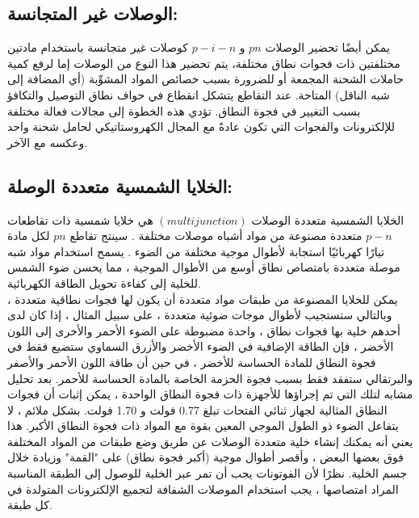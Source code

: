 	\subsection{الوصلات غير المتجانسة: }
	يمكن أيضًا تحضير الوصلات $ p n $ و $ p-i-n $ كوصلات غير متجانسة باستخدام مادتين مختلفتين ذات فجوات نطاق مختلفة، يتم تحضير هذا النوع من الوصلات إما لرفع كمية حاملات الشحنة المجمعة أو للضرورة بسبب خصائص المواد المشوِّبة (أي المضافة إلى شبه الناقل) المتاحة. عند التقاطع يتشكل انقطاع في حواف نطاق التوصيل والتكافؤ بسبب التغيير في فجوة النطاق. تؤدي هذه الخطوة إلى مجالات فعالة مختلفة للإلكترونات والفجوات التي تكون عادةً مع المجال الكهروستاتيكي لحامل شحنة واحد وعكسه مع الآخر.
\subsection{الخلايا الشمسية متعددة الوصلة:}
	الخلايا الشمسية متعددة الوصلات $ (multi junction ) $ هي خلايا شمسية ذات تقاطعات $ p-n $ متعددة مصنوعة من مواد أشباه موصلات مختلفة . سينتج تقاطع $ pn $ لكل مادة تيارًا كهربائيًا استجابة لأطوال موجية مختلفة من الضوء . يسمح استخدام مواد شبه موصلة متعددة بامتصاص نطاق أوسع من الأطوال الموجية ، مما يحسن ضوء الشمس للخلية إلى كفاءة تحويل الطاقة الكهربائية.
	\\يمكن للخلايا المصنوعة من طبقات مواد متعددة أن يكون لها فجوات نطاقية متعددة ، وبالتالي ستستجيب لأطوال موجات ضوئية متعددة ،
	على سبيل المثال ، إذا كان لدى أحدهم خلية بها فجوات نطاق ، واحدة مضبوطة على الضوء الأحمر والأخرى إلى اللون الأخضر ، فإن الطاقة الإضافية في الضوء الأخضر والأزرق السماوي ستضيع فقط في فجوة النطاق للمادة الحساسة للأخضر ، في حين أن طاقة اللون الأحمر والأصفر والبرتقالي ستفقد فقط بسبب فجوة الحزمة الخاصة بالمادة الحساسة للأحمر. بعد تحليل مشابه لتلك التي تم إجراؤها للأجهزة ذات فجوة النطاق الواحدة ، يمكن إثبات أن فجوات النطاق المثالية لجهاز ثنائي الفتحات تبلغ 0.77  فولت و 1.70  فولت. بشكل ملائم ، لا يتفاعل الضوء ذو الطول الموجي المعين بقوة مع المواد ذات فجوة النطاق الأكبر. هذا يعني أنه يمكنك إنشاء خلية متعددة الوصلات عن طريق وضع طبقات من المواد المختلفة فوق بعضها البعض ، وأقصر أطوال موجية (أكبر فجوة نطاق) على "القمة" وزيادة خلال جسم الخلية. نظرًا لأن الفوتونات يجب أن تمر عبر الخلية للوصول إلى الطبقة المناسبة المراد امتصاصها ، يجب استخدام الموصلات الشفافة لتجميع الإلكترونات المتولدة في كل طبقة.
